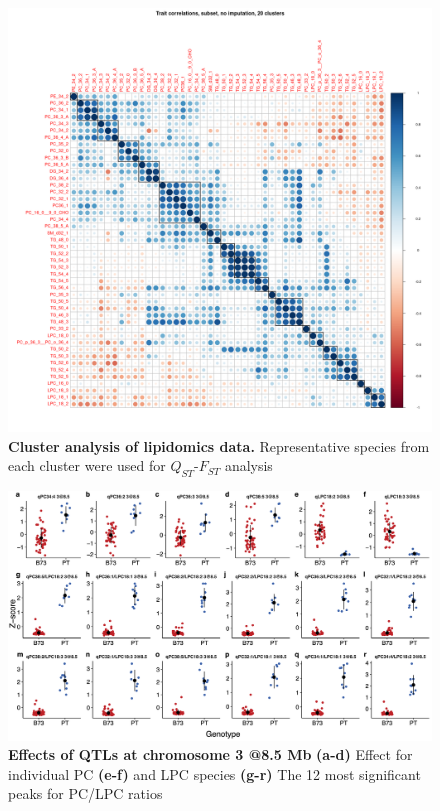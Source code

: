 \begin{figure}[t]
\begin{center}
\includegraphics[width=\linewidth]{Sup_Figures/Sup_Fig_1.png}
\caption[Cluster analysis of lipidomics data]{\textbf{Cluster analysis of lipidomics data.} Representative species from each cluster were used for $Q_{ST}$-$F_{ST}$ analysis}
\label{figure:Sup:lipid_clusters}
\end{center}
\end{figure} 
\clearpage

\begin{figure}[t]
\begin{center}
\includegraphics[width=\linewidth]{Sup_Figures/Sup_Fig_2.png}
\caption[Effects of QTLs at chromosome 3 @8.5 Mb]{\textbf{Effects of QTLs at chromosome 3 @8.5 Mb} \textbf{(a-d)} Effect for individual PC \textbf{(e-f)} and LPC species
\textbf{(g-r)} The 12 most significant peaks for PC/LPC ratios} 
\label{figure:Sup:QTL_effect_sp}
\end{center}
\end{figure}  
\clearpage

